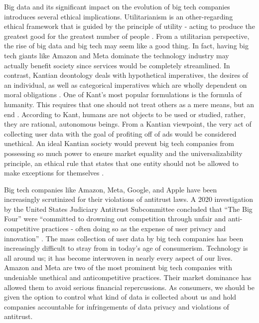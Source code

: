 \documentclass[twoside]{article}
\begin{document}
Big data and its significant impact on the evolution of big tech companies introduces several ethical implications. Utilitarianism is an other-regarding ethical framework that is guided by the principle of utility - acting to produce the greatest good for the greatest number of people \cite{crashcourse2}. From a utilitarian perspective, the rise of big data and big tech may seem like a good thing. In fact, having big tech giants like Amazon and Meta dominate the technology industry may actually benefit society since services would be completely streamlined. In contrast, Kantian deontology deals with hypothetical imperatives, the desires of an individual, as well as categorical imperatives which are wholly dependent on moral obligations \cite{crashcourse1}. One of Kant's most popular formulations is the formula of humanity. This requires that one should not treat others as a mere means, but an end \cite{crashcourse1}. According to Kant, humans are not objects to be used or studied, rather, they are rational, autonomous beings. From a Kantian viewpoint, the very act of collecting user data with the goal of profiting off of ads would be considered unethical. An ideal Kantian society would prevent big tech companies from possessing so much power to ensure market equality and the universalizability principle, an ethical rule that states that one entity should not be allowed to make exceptions for themselves \cite{crashcourse1}.

Big tech companies like Amazon, Meta, Google, and Apple have been increasingly scrutinized for their violations of antitrust laws. A 2020 investigation by the United States Judiciary Antitrust Subcommittee concluded that “The Big Four” were “committed to drowning out competition through unfair and anti-competitive practices - often doing so as the expense of user privacy and innovation'' \cite{monopoly}. The mass collection of user data by big tech companies has been increasingly difficult to stray from in today’s age of consumerism. Technology is all around us; it has become interwoven in nearly every aspect of our lives. Amazon and Meta are two of the most prominent big tech companies with undeniable unethical and anticompetitive practices. Their market dominance has allowed them to avoid serious financial repercussions. As consumers, we should be given the option to control what kind of data is collected about us and hold companies accountable for infringements of data privacy and violations of antitrust.

\newpage
\printbibliography
\end{document}
